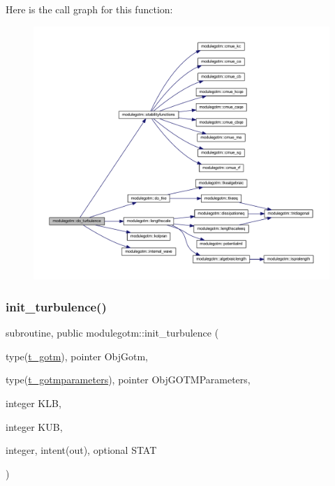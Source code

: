 Here is the call graph for this function\+:\nopagebreak
\begin{figure}[H]
\begin{center}
\leavevmode
\includegraphics[width=350pt]{namespacemodulegotm_a4ca35153e188114f4f02fe276d302d14_cgraph}
\end{center}
\end{figure}
\mbox{\label{namespacemodulegotm_a2bcdea4da65e0575591794282ca6ba41}} 
\subsubsection{\texorpdfstring{init\+\_\+turbulence()}{init\_turbulence()}}
{\footnotesize\ttfamily subroutine, public modulegotm\+::init\+\_\+turbulence (\begin{DoxyParamCaption}\item[{type(\mbox{\hyperlink{structmodulegotm_1_1t__gotm}{t\+\_\+gotm}}), pointer}]{Obj\+Gotm,  }\item[{type(\mbox{\hyperlink{structmodulegotm_1_1t__gotmparameters}{t\+\_\+gotmparameters}}), pointer}]{Obj\+G\+O\+T\+M\+Parameters,  }\item[{integer}]{K\+LB,  }\item[{integer}]{K\+UB,  }\item[{integer, intent(out), optional}]{S\+T\+AT }\end{DoxyParamCaption})}

